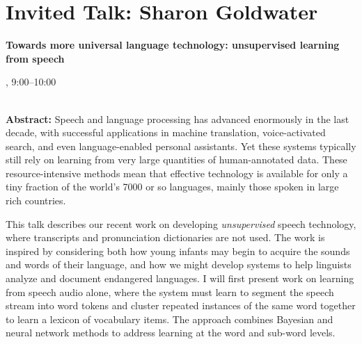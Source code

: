 \section{Invited Talk: Sharon Goldwater}

\begin{center}
\begin{Large}
{\bfseries\Large Towards more universal language technology: unsupervised learning from speech}\vspace{1em}\par
\end{Large}


\daydateyear, 9:00--10:00 \vspace{1em}\\
\PlenaryLoc \\
\vspace{1em}\par
\end{center}

\noindent
{\bfseries Abstract:} Speech and language processing has advanced enormously in the last
        decade, with successful applications in machine translation,
        voice-activated search, and even language-enabled personal
        assistants. Yet these systems typically still rely on learning from
        very large quantities of human-annotated data. These
        resource-intensive methods mean that effective technology is available
        for only a tiny fraction of the world's 7000 or so languages, mainly
        those spoken in large rich countries.
        
        This talk describes our recent work on developing \textit{unsupervised}
        speech technology, where transcripts and pronunciation dictionaries
        are not used. The work is inspired by considering both how young
        infants may begin to acquire the sounds and words of their language,
        and how we might develop systems to help linguists analyze and
        document endangered languages. I will first present work on learning
        from speech audio alone, where the system must learn to segment the
        speech stream into word tokens and cluster repeated instances of the
        same word together to learn a lexicon of vocabulary items. The
        approach combines Bayesian and neural network methods to address
        learning at the word and sub-word levels.

